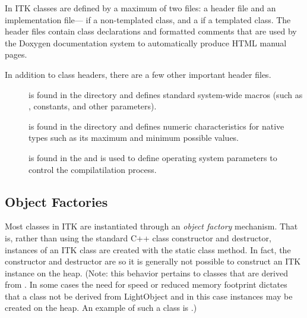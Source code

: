 In ITK classes are defined by a maximum of two files: a header  file
and an implementation file--- if a non-templated class, and a
 if a templated class.
The header files contain class declarations
and formatted comments that are used by the Doxygen documentation
system to automatically produce HTML manual pages.

In addition to class headers, there are a few other important header files.
\begin{description}
        \item[] is found in the  directory
        and defines standard system-wide macros (such as ,
        constants, and other parameters).

        \item[] is found in the  
        directory and defines numeric characteristics for native types such
        as its maximum and minimum possible values.

        \item[] is found in the  
        and is used to define operating system parameters to control
        the compilatilation process.
\end{description}

\subsection{Object Factories}
\label{sec:ObjectFactories}


Most classes in ITK are instantiated through an \emph{object factory}
mechanism. That is, rather than using the standard C++ class constructor and
destructor, instances of an ITK class are created with the static class
 method. In fact, the constructor and destructor are
 so it is generally not possible to construct an ITK
instance on the heap. (Note: this behavior pertains to classes that are
derived from . In some cases the need for speed or
reduced memory footprint dictates that a class not be derived from
LightObject and in this case instances may be created on the heap. An
example of such a class is .)

